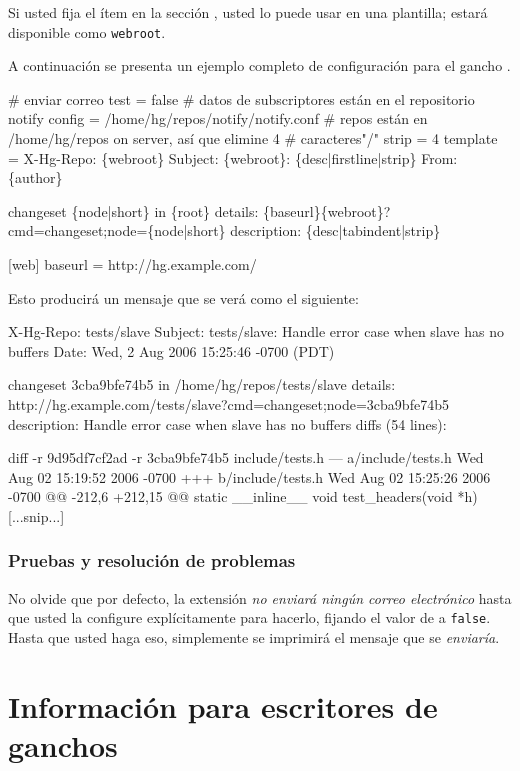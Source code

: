 Si usted fija el ítem  en la sección
, usted lo puede usar en una plantilla; estará
disponible como \texttt{webroot}.

A continuación se presenta un ejemplo completo de configuración para
el gancho .
\begin{codesample2}
  [notify]
  # enviar correo
  test = false
  # datos de subscriptores están en el repositorio notify
  config = /home/hg/repos/notify/notify.conf
  # repos están en /home/hg/repos on server, así que elimine 4
  # caracteres"/"
  strip = 4
  template = X-Hg-Repo: \{webroot\}
    Subject: \{webroot\}: \{desc|firstline|strip\}
    From: \{author\}

    changeset \{node|short\} in \{root\}
    details: \{baseurl\}\{webroot\}?cmd=changeset;node=\{node|short\}
    description:
      \{desc|tabindent|strip\}

  [web]
  baseurl = http://hg.example.com/
\end{codesample2}

Esto producirá un mensaje que se verá como el siguiente:
\begin{codesample2}
  X-Hg-Repo: tests/slave
  Subject: tests/slave: Handle error case when slave has no buffers
  Date: Wed,  2 Aug 2006 15:25:46 -0700 (PDT)

  changeset 3cba9bfe74b5 in /home/hg/repos/tests/slave
  details: http://hg.example.com/tests/slave?cmd=changeset;node=3cba9bfe74b5
  description:
          Handle error case when slave has no buffers
  diffs (54 lines):

  diff -r 9d95df7cf2ad -r 3cba9bfe74b5 include/tests.h
  --- a/include/tests.h      Wed Aug 02 15:19:52 2006 -0700
  +++ b/include/tests.h      Wed Aug 02 15:25:26 2006 -0700
  @@ -212,6 +212,15 @@ static __inline__ void test_headers(void *h)
  [...snip...]
\end{codesample2}

\subsubsection{Pruebas y resolución de problemas}

No olvide que por defecto, la extensión  \emph{no
enviará ningún correo electrónico} hasta que usted la configure
explícitamente para hacerlo, fijando el valor de 
a \texttt{false}.  Hasta que usted haga eso, simplemente se imprimirá
el mensaje que se \emph{enviaría}.

\section{Información para escritores de ganchos}
\label{sec:hook:ref}

